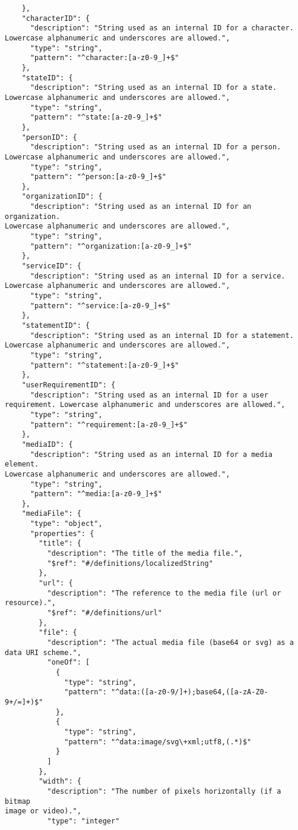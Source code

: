 \documentclass[10pt,letterpaper]{article}
\begin{document}
\begin{verbatim}
    },
    "characterID": {
      "description": "String used as an internal ID for a character.
Lowercase alphanumeric and underscores are allowed.",
      "type": "string",
      "pattern": "^character:[a-z0-9_]+$"
    },
    "stateID": {
      "description": "String used as an internal ID for a state.
Lowercase alphanumeric and underscores are allowed.",
      "type": "string",
      "pattern": "^state:[a-z0-9_]+$"
    },
    "personID": {
      "description": "String used as an internal ID for a person.
Lowercase alphanumeric and underscores are allowed.",
      "type": "string",
      "pattern": "^person:[a-z0-9_]+$"
    },
    "organizationID": {
      "description": "String used as an internal ID for an organization.
Lowercase alphanumeric and underscores are allowed.",
      "type": "string",
      "pattern": "^organization:[a-z0-9_]+$"
    },
    "serviceID": {
      "description": "String used as an internal ID for a service.
Lowercase alphanumeric and underscores are allowed.",
      "type": "string",
      "pattern": "^service:[a-z0-9_]+$"
    },
    "statementID": {
      "description": "String used as an internal ID for a statement.
Lowercase alphanumeric and underscores are allowed.",
      "type": "string",
      "pattern": "^statement:[a-z0-9_]+$"
    },
    "userRequirementID": {
      "description": "String used as an internal ID for a user
requirement. Lowercase alphanumeric and underscores are allowed.",
      "type": "string",
      "pattern": "^requirement:[a-z0-9_]+$"
    },
    "mediaID": {
      "description": "String used as an internal ID for a media element.
Lowercase alphanumeric and underscores are allowed.",
      "type": "string",
      "pattern": "^media:[a-z0-9_]+$"
    },
    "mediaFile": {
      "type": "object",
      "properties": {
        "title": {
          "description": "The title of the media file.",
          "$ref": "#/definitions/localizedString"
        },
        "url": {
          "description": "The reference to the media file (url or
resource).",
          "$ref": "#/definitions/url"
        },
        "file": {
          "description": "The actual media file (base64 or svg) as a
data URI scheme.",
          "oneOf": [
            {
              "type": "string",
              "pattern": "^data:([a-z0-9/]+);base64,([a-zA-Z0-9+/=]+)$"
            },
            {
              "type": "string",
              "pattern": "^data:image/svg\+xml;utf8,(.*)$"
            }
          ]
        },
        "width": {
          "description": "The number of pixels horizontally (if a bitmap
image or video).",
          "type": "integer"

\end{verbatim}
\end{document}
